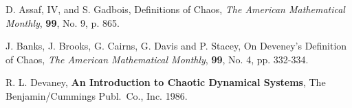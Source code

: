  D. Assaf, IV, and S. Gadbois, Definitions of Chaos,
{\em The American Mathematical Monthly}, {\bfseries 99}, No. 9, p. 865.

 J. Banks, J. Brooks, G. Cairns, G. Davis and
P. Stacey, On Deveney's Definition of Chaos, {\em The American
Mathematical Monthly}, {\bfseries 99}, No. 4, pp. 332-334.

 R. L. Devaney, {\bfseries An Introduction to Chaotic
Dynamical Systems}, The Benjamin/Cummings Publ.\ Co., Inc. 1986.


